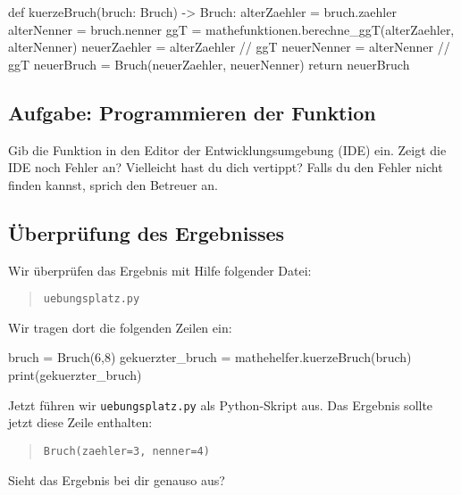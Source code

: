 \begin{codePython}
def kuerzeBruch(bruch: Bruch) -> Bruch:
	alterZaehler = bruch.zaehler
	alterNenner = bruch.nenner
	ggT = mathefunktionen.berechne_ggT(alterZaehler, alterNenner)
	neuerZaehler = alterZaehler // ggT
	neuerNenner = alterNenner // ggT
	neuerBruch = Bruch(neuerZaehler, neuerNenner)
	return neuerBruch
\end{codePython}

\subsection*{Aufgabe: Programmieren der Funktion}

Gib die Funktion in den Editor der Entwicklungsumgebung (IDE) ein. Zeigt die IDE noch Fehler an? Vielleicht hast du dich vertippt? Falls du den Fehler nicht finden kannst, sprich den Betreuer an.

\subsection*{Überprüfung des Ergebnisses}

Wir überprüfen das Ergebnis mit Hilfe folgender Datei:
\begin{quote}
\texttt{uebungsplatz.py}
\end{quote}

Wir tragen dort die folgenden Zeilen ein:

\begin{codePython}
bruch = Bruch(6,8)
gekuerzter_bruch = mathehelfer.kuerzeBruch(bruch)
print(gekuerzter_bruch)
\end{codePython}

Jetzt führen wir \texttt{uebungsplatz.py} als Python-Skript aus. Das Ergebnis sollte jetzt diese Zeile enthalten:
\begin{quote}
\texttt{Bruch(zaehler=3, nenner=4)}
\end{quote}

Sieht das Ergebnis bei dir genauso aus?

